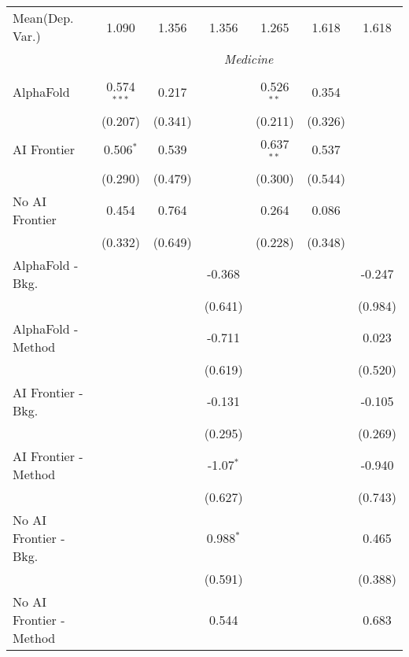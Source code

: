 \begin{tabular}{lcccccc}
Mean(Dep. Var.) & 1.090 & 1.356 & 1.356 & 1.265 & 1.618 & 1.618 \\
 & \multicolumn{6}{c}{\textit{Medicine}} \\ \\
   AlphaFold               & 0.574$^{***}$ & 0.217   &             & 0.526$^{**}$ & 0.354   &   \\   
                           & (0.207)       & (0.341) &             & (0.211)      & (0.326) &   \\   
   AI Frontier             & 0.506$^{*}$   & 0.539   &             & 0.637$^{**}$ & 0.537   &   \\   
                           & (0.290)       & (0.479) &             & (0.300)      & (0.544) &   \\   
   No AI Frontier          & 0.454         & 0.764   &             & 0.264        & 0.086   &   \\   
                           & (0.332)       & (0.649) &             & (0.228)      & (0.348) &   \\   
   AlphaFold - Bkg.        &               &         & -0.368      &              &         & -0.247\\   
                           &               &         & (0.641)     &              &         & (0.984)\\   
   AlphaFold - Method      &               &         & -0.711      &              &         & 0.023\\   
                           &               &         & (0.619)     &              &         & (0.520)\\   
   AI Frontier - Bkg.      &               &         & -0.131      &              &         & -0.105\\   
                           &               &         & (0.295)     &              &         & (0.269)\\   
   AI Frontier - Method    &               &         & -1.07$^{*}$ &              &         & -0.940\\   
                           &               &         & (0.627)     &              &         & (0.743)\\   
   No AI Frontier - Bkg.   &               &         & 0.988$^{*}$ &              &         & 0.465\\   
                           &               &         & (0.591)     &              &         & (0.388)\\   
   No AI Frontier - Method &               &         & 0.544       &              &         & 0.683\\   

\end{tabular}
